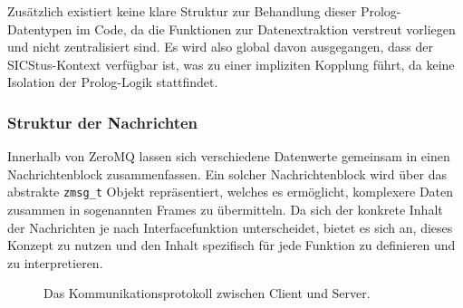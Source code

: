 Zusätzlich existiert keine klare Struktur zur Behandlung dieser Prolog-Datentypen im Code,
da die Funktionen zur Datenextraktion verstreut vorliegen und nicht zentralisiert sind.
Es wird also global davon ausgegangen, dass der SICStus-Kontext verfügbar ist, was zu einer impliziten Kopplung führt, da keine Isolation der Prolog-Logik stattfindet.
\clearpage
\subsubsection{Struktur der Nachrichten}

Innerhalb von ZeroMQ lassen sich verschiedene Datenwerte gemeinsam in einen Nachrichtenblock zusammenfassen.
Ein solcher Nachrichtenblock wird über das abstrakte \texttt{zmsg\_t} Objekt repräsentiert, welches es ermöglicht,
komplexere Daten zusammen in sogenannten Frames zu übermitteln.
Da sich der konkrete Inhalt der Nachrichten je nach Interfacefunktion unterscheidet,
bietet es sich an, dieses Konzept zu nutzen und den Inhalt spezifisch für jede Funktion zu definieren und zu interpretieren.

\begin{figure}[!ht]
  \centering
  \caption{Das Kommunikationsprotokoll zwischen Client und Server.}
  \label{fig:protocol}
\end{figure}

